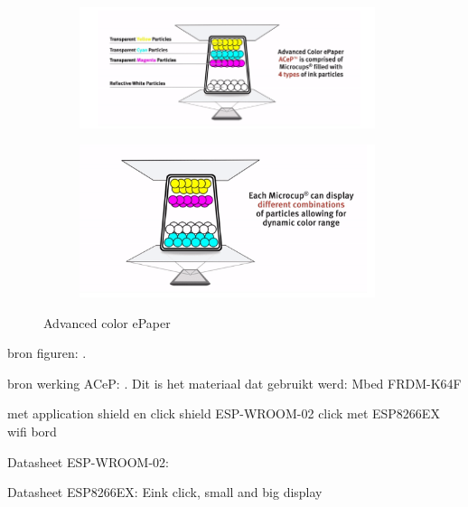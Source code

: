 \documentclass[a4paper,kul]{kulakarticle} %
\begin{document}
\begin{figure}[h]
	\centering
	\begin{subfigure}{.5\textwidth}
		\centering
		\includegraphics[width=0.95\textwidth]{ACeP1}
		\label{fig:subACeP}
	\end{subfigure}%
	\begin{subfigure}{.5\textwidth}
		\centering
		\includegraphics[width=0.95\textwidth]{ACeP2}
		\label{fig:subACeP2}
	\end{subfigure}
	\caption{Advanced color ePaper}
	\label{fig:ACeP}
\end{figure}

bron figuren: \cite{E-ink}.

bron werking ACeP: \cite{ACeP}.
\newline
\newline
Dit is het materiaal dat gebruikt werd:
\newline
Mbed FRDM-K64F

met application shield en click shield
\newline
ESP-WROOM-02 click met ESP8266EX wifi bord

Datasheet ESP-WROOM-02: \cite{ESP-WROOM-02}

Datasheet ESP8266EX: \cite{ESP8266EX}
\newline
Eink click, small and big display

\newpage
\end{document}
